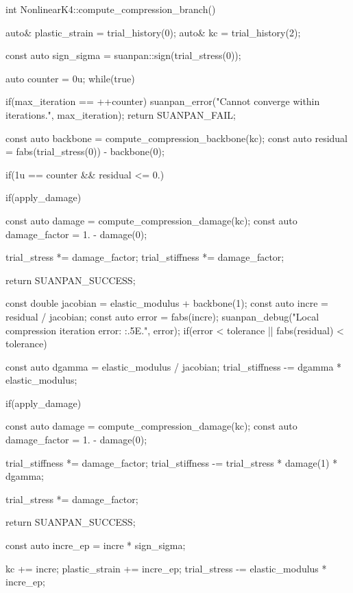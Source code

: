\begin{cppcode}
int NonlinearK4::compute_compression_branch() {
    auto& plastic_strain = trial_history(0);
    auto& kc = trial_history(2);

    const auto sign_sigma = suanpan::sign(trial_stress(0));

    auto counter = 0u;
    while(true) {
        if(max_iteration == ++counter) {
            suanpan_error("Cannot converge within {} iterations.\n", max_iteration);
            return SUANPAN_FAIL;
        }

        const auto backbone = compute_compression_backbone(kc);
        const auto residual = fabs(trial_stress(0)) - backbone(0);

        if(1u == counter && residual <= 0.) {
            if(apply_damage) {
                const auto damage = compute_compression_damage(kc);
                const auto damage_factor = 1. - damage(0);

                trial_stress *= damage_factor;
                trial_stiffness *= damage_factor;
            }

            return SUANPAN_SUCCESS;
        }

        const double jacobian = elastic_modulus + backbone(1);
        const auto incre = residual / jacobian;
        const auto error = fabs(incre);
        suanpan_debug("Local compression iteration error: {:.5E}.\n", error);
        if(error < tolerance || fabs(residual) < tolerance) {
            const auto dgamma = elastic_modulus / jacobian;
            trial_stiffness -= dgamma * elastic_modulus;

            if(apply_damage) {
                const auto damage = compute_compression_damage(kc);
                const auto damage_factor = 1. - damage(0);

                trial_stiffness *= damage_factor;
                trial_stiffness -= trial_stress * damage(1) * dgamma;

                trial_stress *= damage_factor;
            }

            return SUANPAN_SUCCESS;
        }

        const auto incre_ep = incre * sign_sigma;

        kc += incre;
        plastic_strain += incre_ep;
        trial_stress -= elastic_modulus * incre_ep;
    }
}
\end{cppcode}